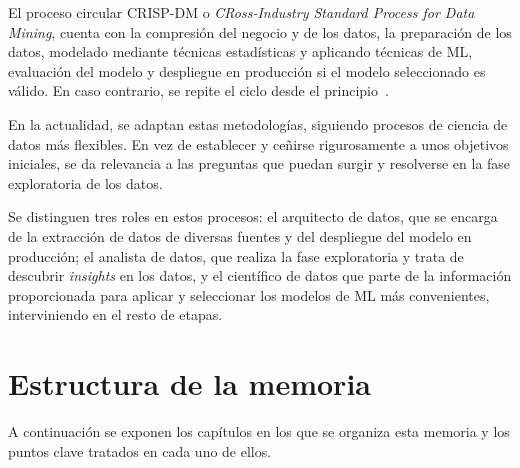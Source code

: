 \documentclass[a4paper, 12pt]{book}
\begin{document}
El proceso circular CRISP-DM o \emph{CRoss-Industry Standard Process for Data Mining}, cuenta con la compresión del negocio y de los datos, la preparación de los datos, modelado mediante técnicas estadísticas y aplicando técnicas de ML, evaluación del modelo y despliegue en producción si el modelo seleccionado es válido. En caso contrario, se repite el ciclo desde el principio~\cite{azevedo2008kdd, navlani2021python}.

En la actualidad, se adaptan estas metodologías, siguiendo procesos de ciencia de datos más flexibles. En vez de establecer y ceñirse rigurosamente a unos objetivos iniciales, se da relevancia a las preguntas que puedan surgir y resolverse en la fase exploratoria de los datos. 

Se distinguen tres roles en estos procesos: el arquitecto de datos, que se encarga de la extracción de datos de diversas fuentes y del despliegue del modelo en producción; el analista de datos, que realiza la fase exploratoria y trata de descubrir \emph{insights} en los datos, y el científico de datos que parte de la información proporcionada para aplicar y seleccionar los modelos de ML más convenientes, interviniendo en el resto de etapas.

\section{Estructura de la memoria}
\label{sec:estructura}

A continuación se exponen los capítulos en los que se organiza esta memoria y los puntos clave tratados en cada uno de ellos. 
\end{document}
